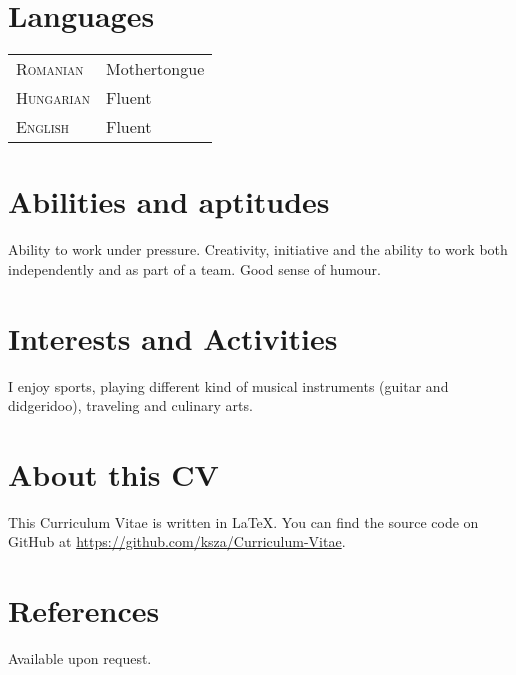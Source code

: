 \documentclass[a4paper,10pt]{article}
\begin{document}
\section{Languages}
\begin{tabular}{p{2.5cm}p{11cm}}
\textsc{Romanian}& Mothertongue\\
\textsc{Hungarian}& Fluent\\
\textsc{English}& Fluent\\
\end{tabular}

\section{Abilities and aptitudes}
Ability to work under pressure.
Creativity, initiative and the ability to work both independently and as part of
a team. Good sense of humour.

\section{Interests and Activities}
I enjoy sports, playing different kind of musical instruments (guitar and
didgeridoo), traveling and culinary arts.

\section{About this CV}
This Curriculum Vitae is written in \LaTeX. You can find the source code on GitHub at \url{https://github.com/ksza/Curriculum-Vitae}.

\section{References}
Available upon request.


\end{document}
